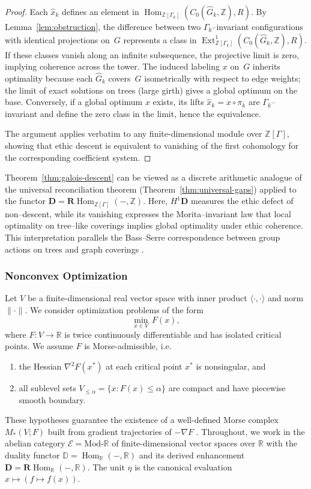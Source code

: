 \documentclass[12pt]{article}
\newcommand{\RR}{\mathbb{R}}
\newcommand{\E}{\mathcal{E}}
\newcommand{\DD}{\mathbb{D}}
\newcommand{\Hom}{\operatorname{Hom}}
\newcommand{\Ext}{\operatorname{Ext}}
\newcommand{\RHom}{\mathbf{R}\!\operatorname{Hom}}
\theoremstyle{plain}
\theoremstyle{definition}
\theoremstyle{remark}
\numberwithin{equation}{section}
\begin{document}
\begin{proof}
Each $\widehat x_k$ defines an element in $\Hom_{\mathbb Z[\Gamma_k]}(C_0(\widehat G_k,\mathbb Z),R)$.  
By Lemma~\ref{lem:obstruction}, the difference between two $\Gamma_k$--invariant configurations with identical projections on~$G$ represents a class in $\Ext^1_{\mathbb Z[\Gamma_k]}(C_0(\widehat G_k,\mathbb Z),R)$.  
If these classes vanish along an infinite subsequence, the projective limit is zero, implying coherence across the tower.  
The induced labeling $x$ on~$G$ inherits optimality because each $\widehat G_k$ covers~$G$ isometrically with respect to edge weights; the limit of exact solutions on trees (large girth) gives a global optimum on the base.  
Conversely, if a global optimum $x$ exists, its lifts $\widehat x_k=x\circ\pi_k$ are $\Gamma_k$--invariant and define the zero class in the limit, hence the equivalence.

The argument applies verbatim to any finite-dimensional module over $\mathbb Z[\Gamma]$, showing that ethic descent is equivalent to vanishing of the first cohomology for the corresponding coefficient system.
\end{proof}

Theorem~\ref{thm:galois-descent} can be viewed as a discrete arithmetic analogue of the universal reconciliation theorem (Theorem~\ref{thm:universal-gaps}) applied to the functor $\mathbf D=\RHom_{\mathbb Z[\Gamma]}(-,\mathbb Z)$.  
Here, $H^1\mathbf D$ measures the ethic defect of non--descent, while its vanishing expresses the Morita--invariant law that local optimality on tree--like coverings implies global optimality under ethic coherence.  
This interpretation parallels the Bass--Serre correspondence between group actions on trees and graph coverings \cite{Serre1977}.

\subsubsection{Nonconvex Optimization}

Let $V$ be a finite-dimensional real vector space with inner product $\langle\cdot,\cdot\rangle$ and norm $\|\cdot\|$.  
We consider optimization problems of the form
\[
\min_{x\in V}\, F(x),
\]
where $F:V\to\RR$ is twice continuously differentiable and has isolated critical points.  
We assume $F$ is Morse-admissible, i.e.
\begin{enumerate}
\item the Hessian $\nabla^2F(x^*)$ at each critical point $x^*$ is nonsingular, and
\item all sublevel sets $V_{\le \alpha}=\{x:F(x)\le\alpha\}$ are compact and have piecewise smooth boundary. 
\end{enumerate}
These hypotheses guarantee the existence of a well-defined Morse complex $M_\ast(V;F)$ built from gradient trajectories of $-\nabla F$ \cite{Milnor1963}.  
Throughout, we work in the abelian category $\E=\mathrm{Mod}\text{-}\RR$ of finite-dimensional vector spaces over $\RR$ with the duality functor $\DD=\Hom_\RR(-,\RR)$ and its derived enhancement $\mathbf D=\RHom_\RR(-,\RR)$.  
The unit $\eta$ is the canonical evaluation $x\mapsto (f\mapsto f(x))$.  
\end{document}
